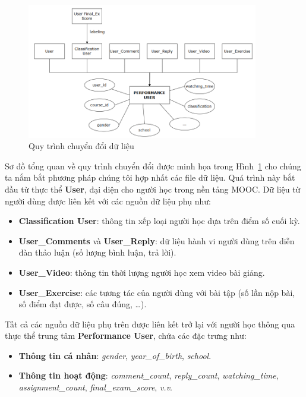 \begin{figure}[H]
    \centering
    \includegraphics[width=0.9\textwidth]{imgs/data-transform.png}
    \caption{Quy trình chuyển đổi dữ liệu}
    \label{fig:data-transform}
\end{figure}

Sơ đồ tổng quan về quy trình chuyển đổi được minh họa trong Hình~\ref{fig:data-transform} cho chúng ta nắm bắt phương pháp chúng tôi hợp nhất các file dữ liệu.
Quá trình này bắt đầu từ thực thể \textbf{User}, đại diện cho người học trong nền tảng MOOC. Dữ liệu từ người dùng được liên kết với các nguồn dữ liệu phụ như:

\begin{itemize}
    \item \textbf{Classification User}: thông tin xếp loại người học dựa trên điểm số cuối kỳ.
    \item \textbf{User\_Comments} và \textbf{User\_Reply}: dữ liệu hành vi người dùng trên diễn đàn thảo luận (số lượng bình luận, trả lời).
    \item \textbf{User\_Video}: thông tin thời lượng người học xem video bài giảng.
    \item \textbf{User\_Exercise}: các tương tác của người dùng với bài tập (số lần nộp bài, số điểm đạt được, số câu đúng, \ldots).
\end{itemize}

Tất cả các nguồn dữ liệu phụ trên được liên kết trở lại với người học thông qua thực thể trung tâm \textbf{Performance User}, chứa các đặc trưng như:

\begin{itemize}
    \item \textbf{Thông tin cá nhân}: \textit{gender}, \textit{year\_of\_birth}, \textit{school}.
    \item \textbf{Thông tin hoạt động}: \textit{comment\_count}, \textit{reply\_count}, \textit{watching\_time}, \textit{assignment\_count}, \textit{final\_exam\_score}, \textit{v.v}.
\end{itemize}

